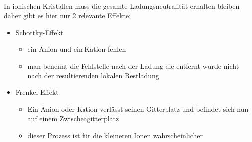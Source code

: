 \documentclass[11pt,a4paper]{article}
\numberwithin{equation}{section}
\numberwithin{figure}{section}
\begin{document}
\\
\begin{addmargin}[25pt]{0pt}     
In ionischen Kristallen muss die gesamte Ladungsneutralität erhalten bleiben daher gibt es hier nur 2 relevante Effekte:
\begin{itemize}
    \item Schottky-Effekt
    \begin{itemize}
        \item ein Anion und ein Kation fehlen
        \item man benennt die Fehlstelle nach der Ladung die entfernt wurde nicht nach der resultierenden lokalen Restladung 
    \end{itemize}
    \item Frenkel-Effekt
    \begin{itemize}
        \item Ein Anion oder Kation verlässt seinen Gitterplatz und befindet sich nun auf einem Zwischengitterplatz
        \item dieser Prozess ist für die kleineren Ionen wahrscheinlicher
    \end{itemize}
\end{itemize}
\end{addmargin}
\newpage
\end{document}
